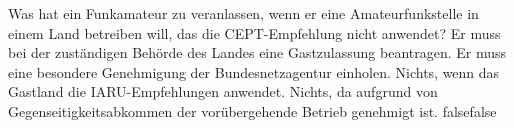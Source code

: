     {Was hat ein Funkamateur zu veranlassen, wenn er eine Amateurfunkstelle in einem Land betreiben will, das die CEPT-Empfehlung nicht anwendet?}
    {Er muss bei der zuständigen Behörde des Landes eine Gastzulassung beantragen.}
    {Er muss eine besondere Genehmigung der Bundesnetzagentur einholen.}
    {Nichts, wenn das Gastland die IARU-Empfehlungen anwendet.}
    {Nichts, da aufgrund von Gegenseitigkeitsabkommen der vorübergehende Betrieb genehmigt ist.}
    {false}{false}